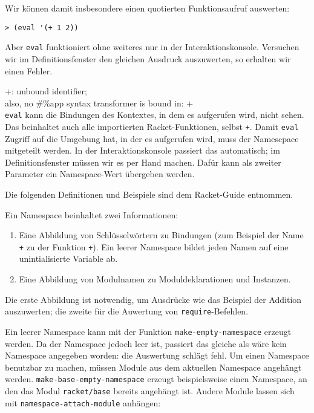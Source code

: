 Wir können damit insbesondere einen quotierten Funktionsaufruf auswerten:

\begin{lstlisting}
> (eval '(+ 1 2))
\end{lstlisting}
{}

Aber \texttt{eval} funktioniert ohne weiteres nur in der Interaktionskonsole. Versuchen wir im Definitionsfenster den gleichen Ausdruck auszuwerten, so erhalten wir einen Fehler.

{\color{red}\ttfamily\small\hspace{5pt} +: unbound identifier;}\\
{\color{red}\ttfamily\small\hspace{5pt} also, no \#\%app syntax transformer is bound in: +}\\

\texttt{eval} kann die Bindungen des Kontextes, in dem es aufgerufen wird, nicht sehen. Das beinhaltet auch alle importierten Racket-Funktionen, selbst \texttt{+}. Damit \texttt{eval} Zugriff auf die Umgebung hat, in der es aufgerufen wird, muss der Namescpace mitgeteilt werden. In der Interaktionskonsole passiert das automatisch; im Definitionsfenster müssen wir es per Hand machen. Dafür kann als zweiter Parameter ein Namespace-Wert übergeben werden. 

Die folgenden Definitionen und Beispiele sind dem Racket-Guide \cite{racketguide-namespace} entnommen.

Ein Namespace beinhaltet zwei Informationen:
\begin{enumerate}
 \item Eine Abbildung von Schlüsselwörtern zu Bindungen (zum Beispiel der Name \texttt{+} zu der Funktion \texttt{+}). Ein leerer Namespace bildet jeden Namen auf eine unintialisierte Variable ab.
 \item Eine Abbildung von Modulnamen zu Moduldeklarationen und Instanzen.
\end{enumerate}

Die erste Abbildung ist notwendig, um Ausdrücke wie das Beispiel der Addition auszuwerten; die zweite für die Auwertung von \texttt{require}-Befehlen.

Ein leerer Namespace kann mit der Funktion \texttt{make-empty-namespace} erzeugt werden. Da der Namespace jedoch leer ist, passiert das gleiche als wäre kein Namespace angegeben worden: die Auswertung schlägt fehl. Um einen Namespace benutzbar zu machen, müssen Module aus dem aktuellen Namespace angehängt werden. \texttt{make-base-empty-namespace} erzeugt beispielsweise einen Namespace, an den das Modul \texttt{racket/base} bereits angehängt ist. Andere Module lassen sich mit \texttt{namespace-attach-module} anhängen:


